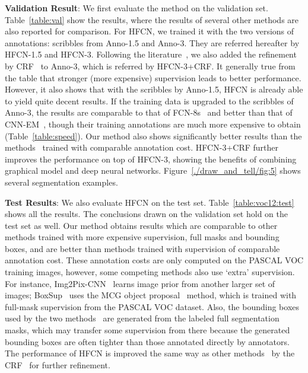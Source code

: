 \textbf{Validation Result}: We first evaluate the method on the
validation set.  Table~\ref{table:val} show the results, where the
results of several other methods are also reported for comparison. For
HFCN, we trained it with the two versions of annotations: scribbles
from Anno-1.5 and Anno-3.  They are referred hereafter by HFCN-1.5 and
HFCN-3.  Following the literature~\citep{rcnn_crf,ConsCNN}, we also
added the refinement by CRF~\citep{fully-crf} to Anno-3, which is
referred by HFCN-3+CRF.  It generally true from the table that
stronger (more expensive) supervision leads to better
performance. However, it also shows that with the scribbles by
Anno-1.5, HFCN is already able to yield quite decent results. If the
training data is upgraded to the scribbles of Anno-3, the results are
comparable to that of FCN-8s~\citep{Long_2015_CVPR} and better than
that of CNN-EM~\citep{cnn:em}, though their training annotations are
much more expensive to obtain (\cf Table~\ref{table:speed}). Our
method also shows significantly better results than the
methods~\citep{whatpoint, ConsCNN} trained with comparable annotation
cost.  HFCN-3+CRF further improves the performance on top of HFCN-3,
showing the benefits of combining graphical model and deep neural
networks.  Figure~\ref{./draw_and_tell/fig:5} shows several segmentation
examples.


\textbf{Test Results}: We also evaluate HFCN on the test
set. Table~\ref{table:voc12:test} shows all the results. The
conclusions drawn on the validation set hold on the test set as
well. Our method obtains results which are comparable to other methods
trained with more expensive supervision, \ie full masks and bounding
boxes, and are better than methods trained with supervision of
comparable annotation cost. These annotation costs are only computed
on the PASCAL VOC training images, however, some competing methods
also use `extra' supervision. For instance,
Img2Pix-CNN~\citep{img:pix:cnn} learns image prior from another larger
set of images; BoxSup~\citep{BoxSup} uses the MCG object
proposal~\citep{MCG} method, which is trained with full-mask
supervision from the PASCAL VOC dataset.  Also, the bounding boxes
used by the two methods~\citep{cnn:em, BoxSup} are generated from the
labeled full segmentation masks, which may transfer some supervision
from there because the generated bounding boxes are often tighter than
those annotated directly by annotators.
The performance of HFCN is improved the same way as other
methods~\citep{rcnn_crf, cnn:em, ConsCNN} by  the
CRF~\citep{fully-crf} for further refinement. 

